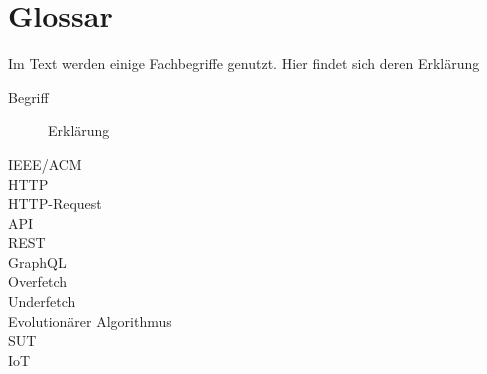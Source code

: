 \chapter{Glossar}

Im Text werden einige Fachbegriffe genutzt. Hier findet sich deren Erklärung

\begin{description}
    \item[Begriff] Erklärung
    \item[IEEE/ACM]
    \item[HTTP]
    \item[HTTP-Request]
    \item[API]
    \item[REST]
    \item[GraphQL]
    \item[Overfetch]
    \item[Underfetch]
    \item[Evolutionärer Algorithmus]
    \item[SUT]
    \item[IoT]
\end{description}

